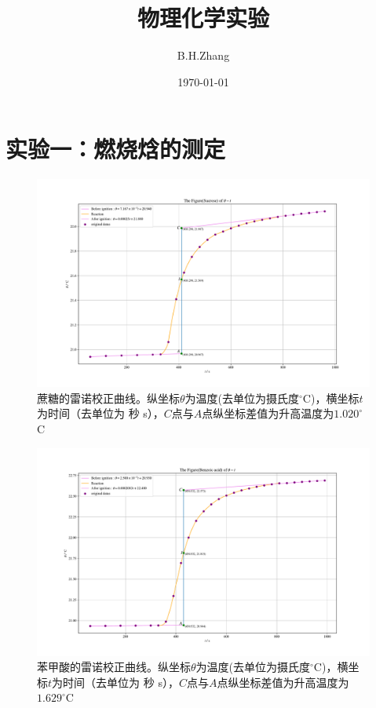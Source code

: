 \documentclass[UTF8,AutoFakeBold,a4paper]{article}
\title{\textbf{物理化学实验}}
\date{\today}
\author{B.H.Zhang}
\begin{document}
	\maketitle
	\section{实验一：燃烧焓的测定}
	\begin{figure}[h]
	\centering
	\includegraphics[scale=0.4]{Fig1}
	\caption{蔗糖的雷诺校正曲线。纵坐标$\theta$为温度(去单位为摄氏度$^{\circ}$C)，横坐标$t$为时间（去单位为 秒 s），$C$点与$A$点纵坐标差值为升高温度为$1.020^{\circ}$C}
	\label{fi6}
\end{figure}

	\begin{figure}[h]
	\centering
	\includegraphics[scale=0.4]{Fig2}
	\caption{苯甲酸的雷诺校正曲线。纵坐标$\theta$为温度(去单位为摄氏度$^{\circ}$C)，横坐标$t$为时间（去单位为 秒 s），$C$点与$A$点纵坐标差值为升高温度为$1.629^{\circ}$C}
	\label{fi8}
\end{figure}
\end{document}
